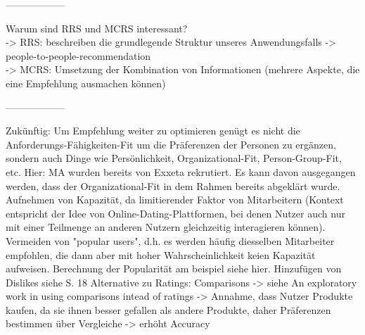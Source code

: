 ------------------

Warum sind RRS und MCRS interessant?\\
-> RRS: beschreiben die grundlegende Struktur unseres Anwendungsfalls -> people-to-people-recommendation\\
-> MCRS: Umsetzung der Kombination von Informationen (mehrere Aspekte, die eine Empfehlung ausmachen können)

------------------

Zukünftig:
Um Empfehlung weiter zu optimieren genügt es nicht die Anforderungs-Fähigkeiten-Fit um die Präferenzen der Personen zu ergänzen, sondern auch Dinge wie Persönlichkeit, Organizational-Fit, Person-Group-Fit, etc.
Hier: MA wurden bereits von Exxeta rekrutiert. Es kann davon ausgegangen werden, dass der Organizational-Fit in dem Rahmen bereits abgeklärt wurde.
Aufnehmen von Kapazität, da limitierender Faktor von Mitarbeitern (Kontext entspricht der Idee von Online-Dating-Plattformen, bei denen Nutzer auch nur mit einer Teilmenge an anderen Nutzern gleichzeitig interagieren können). %
Vermeiden von "popular users", d.h. es werden häufig diesselben Mitarbeiter empfohlen, die dann aber mit hoher Wahrscheinlichkeit keien Kapazität aufweisen. Berechnung der Popularität am beispiel siehe hier. %
Hinzufügen von Dislikes siehe S. 18 %
Alternative zu Ratings: Comparisons -> siehe An exploratory work in using comparisons intead of ratings -> Annahme, dass Nutzer Produkte kaufen, da sie ihnen besser gefallen als andere Produkte, daher Präferenzen bestimmen über Vergleiche -> erhöht Accuracy %


